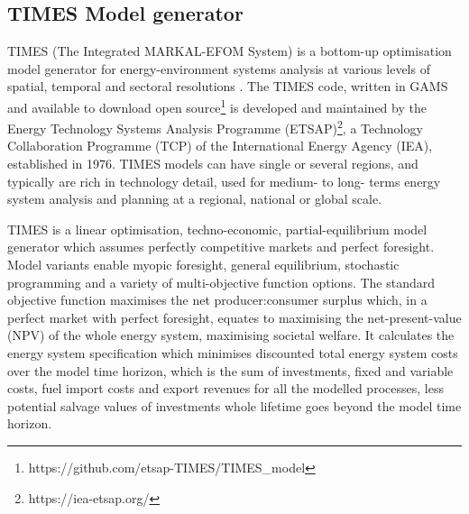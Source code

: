 \documentclass[journal abbreviation, manuscript]{copernicus}
\begin{document}
\subsection{TIMES Model generator}
\label{ss:times_code}
TIMES (The Integrated MARKAL-EFOM System) is a bottom-up optimisation model generator for energy-environment systems analysis at various levels of spatial, temporal and sectoral resolutions \citep{IEA-ETSAP2020a}. The TIMES code, written in GAMS and available to download open source\footnote{https://github.com/etsap-TIMES/TIMES\_model} is developed and maintained by the Energy Technology Systems Analysis Programme (ETSAP)\footnote{https://iea-etsap.org/}, a Technology Collaboration Programme (TCP) of the International Energy Agency (IEA), established in 1976. TIMES models can have single or several regions, and typically are rich in technology detail, used for medium- to long- terms energy system analysis and planning at a regional, national or global scale. 

TIMES is a linear optimisation, techno-economic, partial-equilibrium model generator which assumes perfectly competitive markets and perfect foresight. Model variants enable myopic foresight, general equilibrium, stochastic programming and a variety of multi-objective function options. The standard objective function maximises the net producer:consumer surplus which, in a perfect market with perfect foresight, equates to maximising the net-present-value (NPV) of the whole energy system, maximising societal welfare. It calculates the energy system specification which minimises discounted total energy system costs over the model time horizon, which is the sum of investments, fixed and variable costs, fuel import costs and export revenues for all the modelled processes, less potential salvage values of investments whole lifetime goes beyond the model time horizon. 
\end{document}
